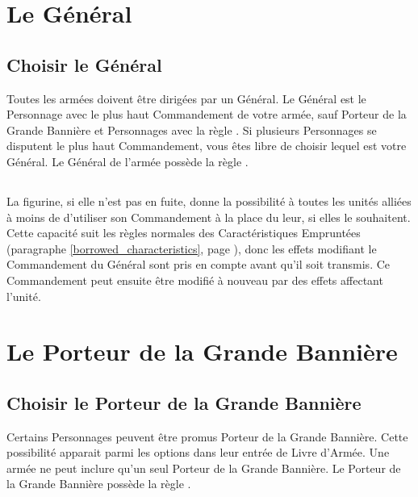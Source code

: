 \newpage
\hypertarget{thegeneral}{\section{Le Général}}
\label{thegeneral}

\subsection{Choisir le Général}
\label{choosing_the_general}

Toutes les armées doivent être dirigées par un Général. Le Général est le Personnage avec le plus haut Commandement de votre armée, sauf Porteur de la Grande Bannière et Personnages avec la règle \notaleader{}. Si plusieurs Personnages se disputent le plus haut Commandement, vous êtes libre de choisir lequel est votre Général. Le Général de l'armée possède la règle \inspiringpresence{}.

\subsection{\inspiringpresence}

La figurine, si elle n'est pas en fuite, donne la possibilité à toutes les unités alliées à moins de  d'utiliser son Commandement à la place du leur, si elles le souhaitent. Cette capacité suit les règles normales des Caractéristiques Empruntées (paragraphe \ref{borrowed_characteristics}, page \pageref{borrowed_characteristics}), donc les effets modifiant le Commandement du Général sont pris en compte avant qu'il soit transmis. Ce Commandement peut ensuite être modifié à nouveau par des effets affectant l'unité.

\hypertarget{thebsb}{\section{Le Porteur de la Grande Bannière}}
\label{thebsb}

\subsection{Choisir le Porteur de la Grande Bannière}

Certains Personnages peuvent être promus Porteur de la Grande Bannière. Cette possibilité apparait parmi les options dans leur entrée de Livre d'Armée. Une armée ne peut inclure qu'un seul Porteur de la Grande Bannière. Le Porteur de la Grande Bannière possède la règle \holdyourground{}.

